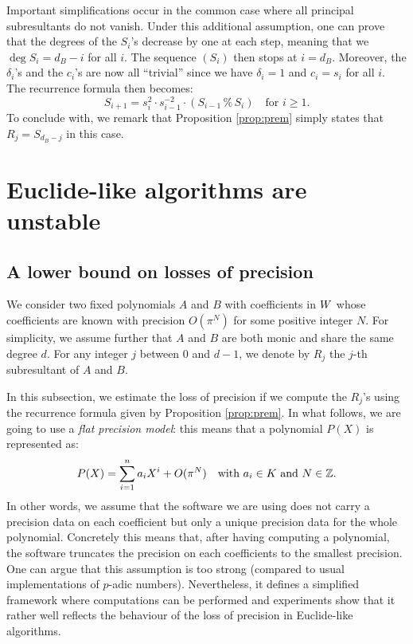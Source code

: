 \documentclass{article}
\begin{document}
Important simplifications occur in the common case where all principal 
subresultants do not vanish. Under this additional assumption, one can 
prove that the degrees of the $S_i$'s decrease by one at each step, 
meaning that we $\deg S_i = d_B - i$ for all $i$. The sequence 
$(S_i)$ then stops at $i = d_B$. Moreover, the $\delta_i$'s and the 
$c_i$'s are now all ``trivial'' since we have $\delta_i = 1$ and $c_i
= s_i$ for all $i$. The recurrence formula then becomes:
$$S_{i+1} = s_i^2 \cdot s_{i-1}^{-2}
\cdot (S_{i-1} \,\%\, S_i) \quad \text{for } i \geq 1.$$
To conclude with, we remark that Proposition \ref{prop:prem} simply 
states that $R_j = S_{d_B-j}$ in this case.

\section{Euclide-like algorithms are unstable}
\label{sec:unstable}



\subsection{A lower bound on losses of precision}

We consider two fixed polynomials $A$ and $B$ with coefficients in $W$ 
whose coefficients are known with precision $O(\pi^N)$ for some positive
integer $N$. For simplicity, we assume further that $A$ and $B$ are both
monic and share the same degree $d$. 
For any integer $j$ between $0$ and $d-1$, we denote by $R_j$ the $j$-th 
subresultant of $A$ and $B$.

In this subsection, we estimate the loss of precision if we compute the 
$R_j$'s using the recurrence formula given by Proposition \ref{prop:prem}. 
In what follows, we are going to use a \emph{flat precision model}: this 
means that a polynomial $P(X)$ is represented as:
$$P(X) = \sum_{i=1}^n a_i X^i + O(\pi^N)
\quad \text{with } a_i \in K \text{ and } N \in \mathbb Z.$$
In other words, we assume that the software we are using does not
carry a precision data on each coefficient but only a unique precision
data for the whole polynomial. Concretely this means that, after having
computing a polynomial, the software truncates the precision on each
coefficients to the smallest precision. 
One can argue that this assumption is too strong (compared to usual
implementations of $p$-adic numbers). Nevertheless, it defines a 
simplified framework where computations can be performed and experiments 
show that it rather well reflects the behaviour of the loss of precision 
in Euclide-like algorithms.
\end{document}
